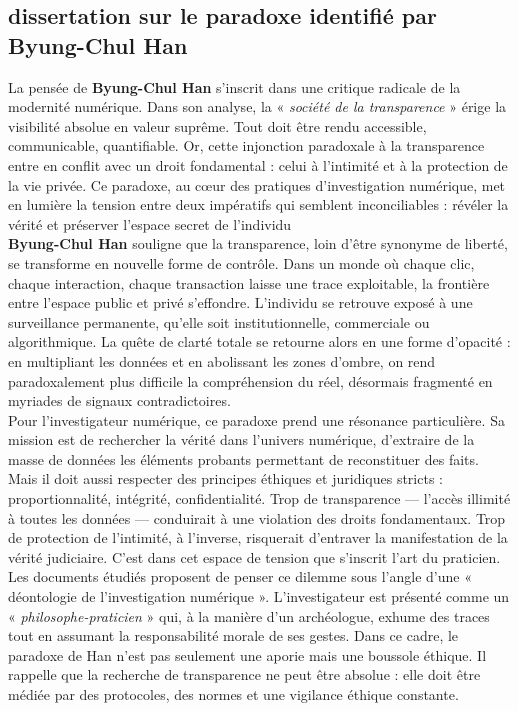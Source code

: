 \documentclass[12pt,a4paper]{article}
\begin{document}
	\subsection{ dissertation sur le paradoxe identifié par Byung-Chul Han}
	

	La pensée de \textbf{Byung-Chul Han} s’inscrit dans une critique radicale de la modernité numérique. Dans son analyse, la «\emph{
	 société de la transparence} » érige la visibilité absolue en valeur suprême. Tout doit être rendu accessible, communicable, quantifiable. Or, cette injonction paradoxale à la transparence entre en conflit avec un droit fondamental : celui à l’intimité et à la protection de la vie privée. Ce paradoxe, au cœur des pratiques d’investigation numérique, met en lumière la tension entre deux impératifs qui semblent inconciliables : révéler la vérité et préserver l’espace secret de l’individu\\

	
	\textbf{Byung-Chul Han} souligne que la transparence, loin d’être synonyme de liberté, se transforme en nouvelle forme de contrôle. Dans un monde où chaque clic, chaque interaction, chaque transaction laisse une trace exploitable, la frontière entre l’espace public et privé s’effondre. L’individu se retrouve exposé à une surveillance permanente, qu’elle soit institutionnelle, commerciale ou algorithmique. La quête de clarté totale se retourne alors en une forme d’opacité : en multipliant les données et en abolissant les zones d’ombre, on rend paradoxalement plus difficile la compréhension du réel, désormais fragmenté en myriades de signaux contradictoires.\\
	
	Pour l’investigateur numérique, ce paradoxe prend une résonance particulière. Sa mission est de rechercher la vérité dans l’univers numérique, d’extraire de la masse de données les éléments probants permettant de reconstituer des faits. Mais il doit aussi respecter des principes éthiques et juridiques stricts : proportionnalité, intégrité, confidentialité. Trop de transparence — l’accès illimité à toutes les données — conduirait à une violation des droits fondamentaux. Trop de protection de l’intimité, à l’inverse, risquerait d’entraver la manifestation de la vérité judiciaire. C’est dans cet espace de tension que s’inscrit l’art du praticien.\\
	
	
	Les documents étudiés proposent de penser ce dilemme sous l’angle d’une « déontologie de l’investigation numérique ». L’investigateur est présenté comme un « \emph{philosophe-praticien }» qui, à la manière d’un archéologue, exhume des traces tout en assumant la responsabilité morale de ses gestes. Dans ce cadre, le paradoxe de Han n’est pas seulement une aporie mais une boussole éthique. Il rappelle que la recherche de transparence ne peut être absolue : elle doit être médiée par des protocoles, des normes et une vigilance éthique constante.\\
	
\end{document}
